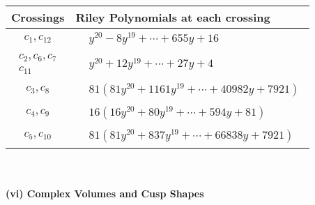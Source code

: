 \documentclass[1p]{elsarticle_modified}
\theoremstyle{definition}
\begin{document}
\begin{tabular}{m{50pt}|m{274pt}}
Crossings & \hspace{64pt}Riley Polynomials at each crossing \\
\hline $$\begin{aligned}c_{1},c_{12}\end{aligned}$$&$\begin{aligned}
&y^{20}-8 y^{19}+\cdots+655 y+16
\end{aligned}$\\
\hline $$\begin{aligned}c_{2},c_{6},c_{7}\\c_{11}\end{aligned}$$&$\begin{aligned}
&y^{20}+12 y^{19}+\cdots+27 y+4
\end{aligned}$\\
\hline $$\begin{aligned}c_{3},c_{8}\end{aligned}$$&$\begin{aligned}
&81(81 y^{20}+1161 y^{19}+\cdots+40982 y+7921)
\end{aligned}$\\
\hline $$\begin{aligned}c_{4},c_{9}\end{aligned}$$&$\begin{aligned}
&16(16 y^{20}+80 y^{19}+\cdots+594 y+81)
\end{aligned}$\\
\hline $$\begin{aligned}c_{5},c_{10}\end{aligned}$$&$\begin{aligned}
&81(81 y^{20}+837 y^{19}+\cdots+66838 y+7921)
\end{aligned}$\\
\hline
\end{tabular}\\~\\
\newpage\flushleft \textbf{(vi) Complex Volumes and Cusp Shapes}
\end{document}

